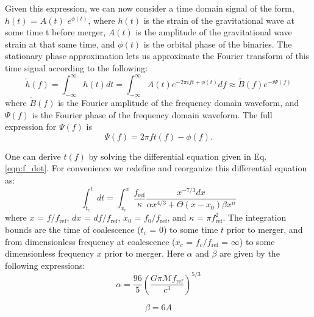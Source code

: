 Given this expression, we can now consider a time domain signal of the form, $h(t)$ = $A(t)$ $e^{\phi(t)}$, where $h(t)$ is the strain of the gravitational wave at some time t before merger, $A(t)$ is the amplitude of the gravitational wave strain at that same time, and $\phi(t)$ is the orbital phase of the binaries\cite{2008gravitational}. The stationary phase approximation lets us approximate the Fourier transform of this time signal according to the following:
\begin{equation}\label{eqn:SPA}
\tilde{h}(f) = \int_{-\infty}^{\infty} h(t) dt = \int_{-\infty}^{\infty} A(t) e^{-2\pi i ft + \phi(t)} df \approx \tilde{B}(f) e^{-i\Psi(f)}
\end{equation}
where $\tilde{B}(f)$ is the Fourier amplitude of the frequency domain waveform, and $\Psi(f)$ is the Fourier phase of the frequency domain waveform. The full expression for $\Psi(f)$ is
\begin{equation}\label{eqn:SPA_Phase}
\Psi(f) = 2\pi f t(f) - \phi(f).
\end{equation}

One can derive $t(f)$ by solving the differential equation given in Eq. \ref{eqn:f_dot}. For convenience we redefine and reorganize this differential equation as:
\begin{equation}\label{eqn:unitless_f_dot}
\int_{t_c}^t dt = \int_{x_c}^{x}  \frac{f_{\mathrm{ref}}}{\kappa} \frac{x^{-7/3} dx}{\alpha x^{4/3} +  \Theta(x - x_0) \beta x^n}
\end{equation}
where $x$ = $f / f_{\mathrm{ref}}$, $dx$ = $df / f_{\mathrm{ref}}$, $x_0$ = $f_0 / f_{\mathrm{ref}}$, and $\kappa$ = $\pi f_{\mathrm{ref}}^2$. The integration bounds are the time of coalescence ($t_c$ = 0) to some time $t$ prior to merger, and from dimensionless frequency at coalescence ($x_c$ = $f_c / f_{\mathrm{ref}}$ = $\infty$) to some dimensionless frequency $x$ prior to merger. Here $\alpha$ and $\beta$ are given by the following expressions:
\begin{equation}
\alpha = \frac{96}{5} \left ( \frac{G \pi \mathcal{M} f_{\mathrm{ref}}}{c^3} \right )^{5/3}
\end{equation}

\begin{equation}
\beta = 6 A
\end{equation}

